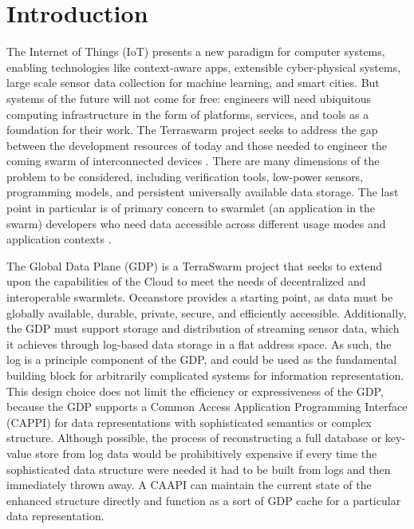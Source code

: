 \documentclass[10pt,twocolumn]{article}
\begin{document}
\section{Introduction}
The Internet of Things (IoT) presents a new paradigm for computer systems, enabling technologies like  context-aware apps, extensible cyber-physical systems, large scale sensor data collection for machine learning, and smart cities. But systems of the future will not come for free: engineers will need ubiquitous computing infrastructure in the form of platforms, services, and tools as a foundation for their work. The Terraswarm project \cite{lee_terraswarm_2012} seeks to address the gap between the development resources of today and those needed to engineer the coming swarm of interconnected devices \cite{rabaey_swarm_2011}. There are many dimensions of the problem to be considered, including verification tools, low-power sensors, programming models, and persistent universally available data storage. The last point in particular is of primary concern to swarmlet (an application in the swarm) developers who need data accessible across different usage modes and application contexts \cite{DabbeltKubiatowicz13_CaseForUniversalDataPlane}.

The Global Data Plane (GDP) \cite{Kubiatowicz14_EnablingSwarmThroughGlobalDataPlane} is a TerraSwarm project that seeks to extend upon the capabilities of the Cloud to meet the needs of decentralized and interoperable swarmlets. Oceanstore \cite{rhea_pond:_2003} provides a starting point, as data must be globally available, durable, private, secure, and efficiently accessible. Additionally, the GDP must support storage and distribution of streaming sensor data, which it achieves through log-based data storage in a flat address space. As such, the log is a principle component of the GDP, and could be used as the fundamental building block for arbitrarily complicated systems for information representation. This design choice does not limit the efficiency or expressiveness of the GDP, because the GDP supports a Common Access Application Programming Interface (CAPPI) for data representations with sophisticated semantics or complex structure.  Although possible, the process of reconstructing a full database or key-value store from log data would be prohibitively expensive if every time the sophisticated data structure were needed it had to be built from logs and then immediately thrown away. A CAAPI can maintain the current state of the enhanced structure  
directly and function as a sort of GDP cache for a particular data representation.
\end{document}
